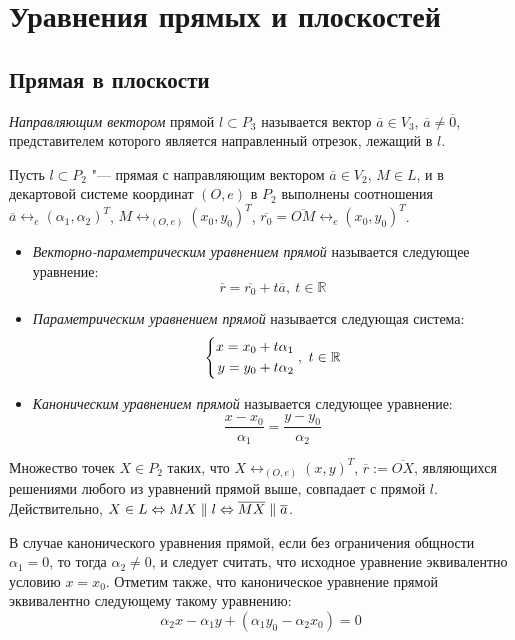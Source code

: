 \section{Уравнения прямых и плоскостей}

\subsection{Прямая в плоскости}

\begin{definition}
	\textit{Направляющим вектором} прямой $l \subset P_3$ называется вектор $\overline{a} \in V_3$, $\overline{a} \ne \overline 0$, представителем которого является направленный отрезок, лежащий в $l$.
\end{definition}

\begin{definition}
	Пусть $l \subset P_2$ "--- прямая с направляющим вектором $\overline{a} \in V_2$, $M \in L$, и в декартовой системе координат $(O, e)$ в $P_2$ выполнены соотношения $\overline{a} \leftrightarrow_{e} (\alpha_1, \alpha_2)^T$, $M \leftrightarrow_{(O, e)} (x_0, y_0)^T$, $\overline{r_0} = \overline{OM} \leftrightarrow_{e} (x_0, y_0)^T$.
	\begin{itemize}
		\item \textit{Векторно-параметрическим уравнением прямой} называется следующее уравнение:
		\[\overline{r} = \overline{r_0} + t\overline{a},~t \in \mathbb{R}\]
		\item \textit{Параметрическим уравнением прямой} называется следующая система:
		\[\left\{
		\begin{aligned}
			x = x_0 + t\alpha_1\\
			y = y_0 + t\alpha_2
		\end{aligned}
		\right.,~t \in \mathbb{R}
		\]
		\item \textit{Каноническим уравнением прямой} называется следующее уравнение:
		\[\frac{x - x_0}{\alpha_1} = \frac{y - y_0}{\alpha_2}\]
	\end{itemize}
\end{definition}

\begin{note}
	Множество точек $X \in P_2$ таких, что $X \leftrightarrow_{(O, e)} (x, y)^T$, $\overline{r} := \overline{OX}$, являющихся решениями любого из уравнений прямой выше, совпадает с прямой $l$. Действительно, $X \in L \Leftrightarrow MX \parallel l \Leftrightarrow \overline{MX} \parallel \overline{a}$.
\end{note}

\begin{note}
	В случае канонического уравнения прямой, если без ограничения общности $\alpha_1 = 0$, то тогда $\alpha_2 \ne 0$, и следует считать, что исходное уравнение эквивалентно условию $x = x_0$. Отметим также, что каноническое уравнение прямой эквивалентно следующему такому уравнению:
	\[\alpha_2 x - \alpha_1 y + (\alpha_1 y_0 - \alpha_2 x_0) = 0\]
\end{note}

